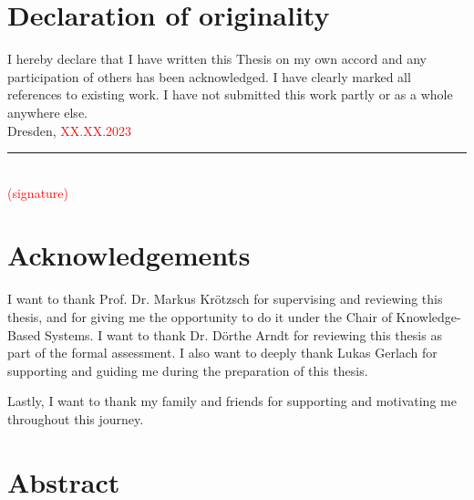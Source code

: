 \documentclass[12 pt, a4paper]{report}
\theoremstyle{definition}
\newcommand{\blankpage}{
\newpage
\thispagestyle{empty}
\addtocounter{page}{-1}
\mbox{}
\newpage
}
\begin{document}
\sloppy

\blankpage

\chapter*{Declaration of originality}
I hereby declare that I have written this Thesis on my own accord and any participation of others has been acknowledged. I have clearly marked all references to existing work. I have not submitted this work partly or as a whole anywhere else. \\

Dresden, \textcolor{red}{XX.XX.2023} \\
\rule{150 px}{0.5 px} \\
\textcolor{red}{(signature)}
\blankpage

\chapter*{Acknowledgements}
I want to thank Prof. Dr. Markus Kr{\"otzsch} for supervising and reviewing this thesis, and for giving me the opportunity to do it under the Chair of Knowledge-Based Systems. I want to thank Dr. D{\"o}rthe Arndt for reviewing this thesis as part of the formal assessment. I also want to deeply thank Lukas Gerlach for supporting and guiding me during the preparation of this thesis.

Lastly, I want to thank my family and friends for supporting and motivating me throughout this journey.
\blankpage

%

\chapter*{Abstract}
\end{document}
